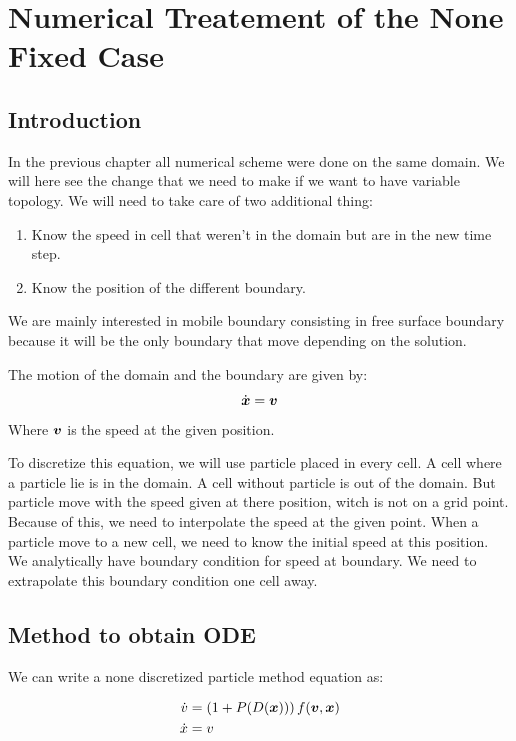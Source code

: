 \chapter{Numerical Treatement of the None Fixed Case }
\minitoc
\section{Introduction}
In the previous chapter all numerical scheme were done on the same domain.
We will here see the change that we need to make if we want to have variable topology.
We will need to take care of two additional thing:
\begin{enumerate}
\item Know the speed in cell that weren't in the domain but are in the new time step.
\item Know the position of the different boundary.
\end{enumerate}

We are mainly interested in mobile boundary consisting in free surface boundary because it will be the only
boundary that move depending on the solution.

The motion of the domain and the boundary are given by:
\begin{equation}
\dot{{\boldsymbol {x}}}={\boldsymbol {v}}
\end{equation}
Where ${\boldsymbol {v}}$ is the speed at the given position.

To discretize this equation, we will use particle  placed in every cell. A cell where a particle lie is in the domain.
A cell without particle is out of the domain.
But particle move with the speed given at there position, witch is not on a grid point.
Because of this, we need to interpolate the speed at the given point.
When a particle move to a new cell, we need to know the initial speed at this position.
We analytically have boundary condition for speed at boundary.
We need to extrapolate this boundary condition one cell away.

\section{Method to obtain ODE}

We can write a none discretized particle method equation as:

\begin{align*}
	\dot{v}&=\left(1 + P(D({\boldsymbol {x}}))\right)f({\boldsymbol {v}},{\boldsymbol {x}})\\
	\dot{x}&=v
\end{align*}

